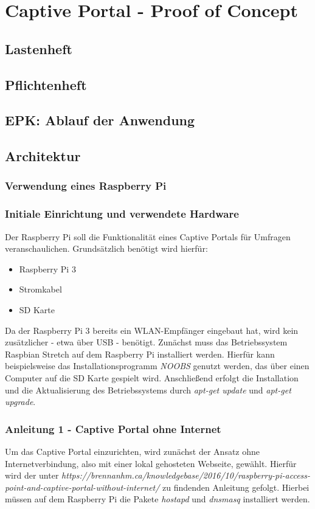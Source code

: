 \section{Captive Portal - Proof of Concept}
\label{section:realisation:captive_portal}
\subsection{Lastenheft}

\subsection{Pflichtenheft}

\subsection{EPK: Ablauf der Anwendung}

\subsection{Architektur}
\subsubsection{Verwendung eines Raspberry Pi}
\subsubsection*{Initiale Einrichtung und verwendete Hardware}
Der Raspberry Pi soll die Funktionalität eines Captive Portals für Umfragen veranschaulichen. Grundsätzlich benötigt wird hierfür:
\begin{itemize}
\item Raspberry Pi 3
\item Stromkabel
\item SD Karte
\end{itemize}

Da der Raspberry Pi 3 bereits ein WLAN-Empfänger eingebaut hat, wird kein zusätzlicher - etwa über USB - benötigt. Zunächst muss das Betriebssystem Raspbian Stretch auf dem Raspberry Pi  installiert werden. Hierfür kann beispielsweise das Installationsprogramm \textit{NOOBS} genutzt werden, das über einen Computer auf die SD Karte gespielt wird. Anschließend erfolgt die Installation und die Aktualisierung des Betriebssystems durch \textit{apt-get update} und \textit{apt-get upgrade}.

\subsubsection*{Anleitung 1 - Captive Portal ohne Internet}
Um das Captive Portal einzurichten, wird zunächst der Ansatz ohne Internetverbindung, also mit einer lokal gehosteten Webseite, gewählt. Hierfür wird der unter \textit{https://brennanhm.ca/knowledgebase/2016/10/raspberry-pi-access-point-and-captive-portal-without-internet/} zu findenden Anleitung gefolgt. Hierbei müssen auf dem Raspberry Pi die Pakete \textit{hostapd} und \textit{dnsmasq} installiert werden.

